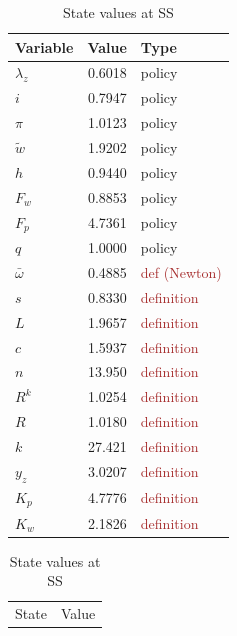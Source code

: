 \documentclass[11pt]{article}
\begin{document}
\begin{table}[h!]
\centering
\begin{minipage}[t]{0.45\linewidth}
\centering
\caption{Policy \& definition values at SS}
\begin{tabular}{lrl}
\toprule
Variable & Value & Type \\
\midrule
$\lambda_z$  & 0.6018 & \textcolor{orange!80!black}{policy} \\
$i$          & 0.7947 & \textcolor{orange!80!black}{policy} \\
$\pi$        & 1.0123 & \textcolor{orange!80!black}{policy} \\
$\tilde{w}$  & 1.9202 & \textcolor{orange!80!black}{policy} \\
$h$          & 0.9440 & \textcolor{orange!80!black}{policy} \\
$F_w$        & 0.8853 & \textcolor{orange!80!black}{policy} \\
$F_p$        & 4.7361 & \textcolor{orange!80!black}{policy} \\
$q$          & 1.0000 & \textcolor{orange!80!black}{policy} \\
\midrule
$\bar\omega$ & 0.4885 & \textcolor{brown}{def (Newton)} \\
$s$          & 0.8330 & \textcolor{brown}{definition} \\
$L$          & 1.9657 & \textcolor{brown}{definition} \\
$c$          & 1.5937 & \textcolor{brown}{definition} \\
$n$          & 13.950 & \textcolor{brown}{definition} \\
$R^k$        & 1.0254 & \textcolor{brown}{definition} \\
$R$          & 1.0180 & \textcolor{brown}{definition} \\
$k$          & 27.421 & \textcolor{brown}{definition} \\
$y_z$        & 3.0207 & \textcolor{brown}{definition} \\
$K_p$        & 4.7776 & \textcolor{brown}{definition} \\
$K_w$        & 2.1826 & \textcolor{brown}{definition} \\
\bottomrule
\end{tabular}
\end{minipage}\hfill
\begin{minipage}[t]{0.45\linewidth}
\centering
\caption{State values at SS}
\begin{tabular}{lr}
\toprule
State & Value \\

\end{tabular}
\end{minipage}
\end{table}
\end{document}
